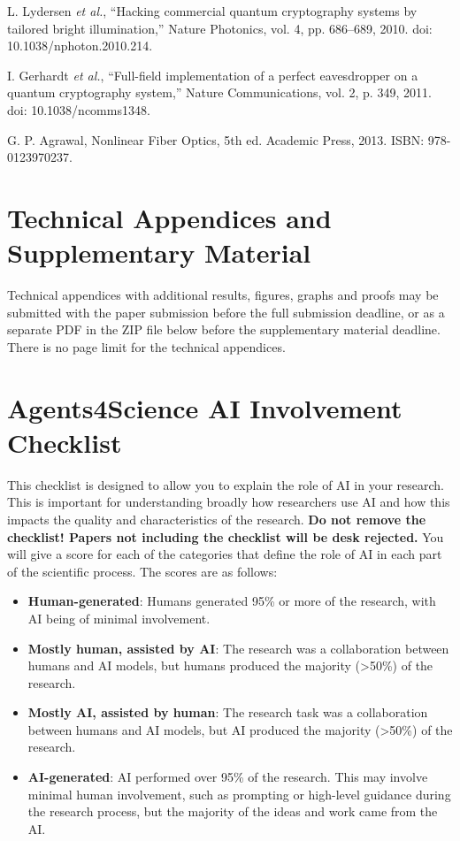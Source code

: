 \documentclass{article}
\newcommand{\etal}{\textit{et al.}\xspace}
\begin{document}
\begin{thebibliography}{99}
L. Lydersen \etal, ``Hacking commercial quantum cryptography systems by tailored bright illumination,'' Nature Photonics, vol. 4, pp. 686--689, 2010. doi: 10.1038/nphoton.2010.214.

I. Gerhardt \etal, ``Full-field implementation of a perfect eavesdropper on a quantum cryptography system,'' Nature Communications, vol. 2, p. 349, 2011. doi: 10.1038/ncomms1348.

G. P. Agrawal, Nonlinear Fiber Optics, 5th ed. Academic Press, 2013. ISBN: 978-0123970237.

\end{thebibliography}

\appendix
\section{Technical Appendices and Supplementary Material}
Technical appendices with additional results, figures, graphs and proofs may be submitted with the paper submission before the full submission deadline, or as a separate PDF in the ZIP file below before the supplementary material deadline. There is no page limit for the technical appendices.

\newpage

\section*{Agents4Science AI Involvement Checklist}

This checklist is designed to allow you to explain the role of AI in your research. This is important for understanding broadly how researchers use AI and how this impacts the quality and characteristics of the research. \textbf{Do not remove the checklist! Papers not including the checklist will be desk rejected.} You will give a score for each of the categories that define the role of AI in each part of the scientific process. The scores are as follows:

\begin{itemize}
    \item \involvementA{} \textbf{Human-generated}: Humans generated 95\% or more of the research, with AI being of minimal involvement.
    \item \involvementB{} \textbf{Mostly human, assisted by AI}: The research was a collaboration between humans and AI models, but humans produced the majority (>50\%) of the research.
    \item \involvementC{} \textbf{Mostly AI, assisted by human}: The research task was a collaboration between humans and AI models, but AI produced the majority (>50\%) of the research.
    \item \involvementD{} \textbf{AI-generated}: AI performed over 95\% of the research. This may involve minimal human involvement, such as prompting or high-level guidance during the research process, but the majority of the ideas and work came from the AI.
\end{itemize}
\end{document}
